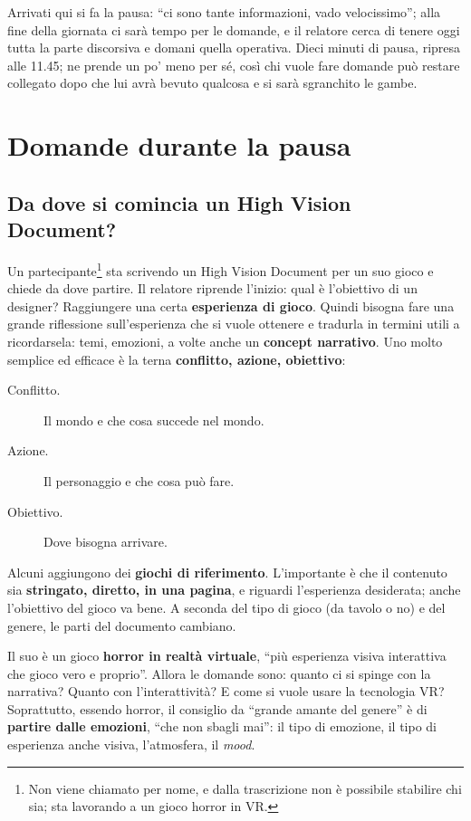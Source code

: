 Arrivati qui si fa la pausa: ``ci sono tante informazioni, vado velocissimo'';
alla fine della giornata ci sarà tempo per le domande, e il relatore cerca di
tenere oggi tutta la parte discorsiva e domani quella operativa. Dieci minuti di
pausa, ripresa alle 11.45; ne prende un po' meno per sé, così chi vuole fare
domande può restare collegato dopo che lui avrà bevuto qualcosa e si sarà
sgranchito le gambe.

\section{Domande durante la pausa}
\label{sec:z6-pausa}

\subsection{Da dove si comincia un High Vision Document?}

Un partecipante\footnote{Non viene chiamato per nome, e dalla trascrizione
non è possibile stabilire chi sia; sta lavorando a un gioco horror in VR.} sta scrivendo un High
Vision Document per un suo gioco e chiede da dove partire. Il relatore riprende
l'inizio: qual è l'obiettivo di un designer? Raggiungere una certa
\textbf{esperienza di gioco}. Quindi bisogna fare una grande riflessione
sull'esperienza che si vuole ottenere e tradurla in termini utili a ricordarsela:
temi, emozioni, a volte anche un \textbf{concept narrativo}. Uno molto semplice ed
efficace è la terna \textbf{conflitto, azione, obiettivo}:
\begin{description}
  \item[Conflitto.] Il mondo e che cosa succede nel mondo.
  \item[Azione.] Il personaggio e che cosa può fare.
  \item[Obiettivo.] Dove bisogna arrivare.
\end{description}
Alcuni aggiungono dei \textbf{giochi di riferimento}. L'importante è che il
contenuto sia \textbf{stringato, diretto, in una pagina}, e riguardi
l'esperienza desiderata; anche l'obiettivo del gioco va bene. A seconda del tipo
di gioco (da tavolo o no) e del genere, le parti del documento cambiano.

Il suo è un gioco \textbf{horror in realtà virtuale}, ``più esperienza visiva
interattiva che gioco vero e proprio''. Allora le domande sono: quanto ci si
spinge con la narrativa? Quanto con l'interattività? E come si vuole usare la
tecnologia VR? Soprattutto, essendo horror, il consiglio da ``grande amante del
genere'' è di \textbf{partire dalle emozioni}, ``che non sbagli mai'': il tipo di
emozione, il tipo di esperienza anche visiva, l'atmosfera, il \emph{mood}.

